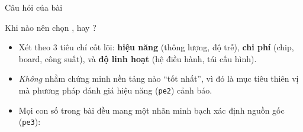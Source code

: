 
\begin{frame}{Câu hỏi của bài}
\begin{center}
{\Large Khi nào nên chọn \MCU, \FPGA{} hay \SoC?}
\end{center}
\bigskip
\begin{itemize}\setlength{\itemsep}{6pt}
\item Xét theo 3 tiêu chí cốt lõi: \textbf{hiệu năng} (thông lượng, độ trễ), \textbf{chi phí} (chip, board, công suất), và \textbf{độ linh hoạt} (hệ điều hành, tái cấu hình).
\item \emph{Không} nhằm chứng minh nền tảng nào ``tốt nhất'', vì đó là mục tiêu thiên vị mà phương pháp đánh giá hiệu năng (\texttt{pe2}) cảnh báo.
\item Mọi con số trong bài đều mang một nhãn minh bạch xác định nguồn gốc (\texttt{pe3}):\\
          
\end{itemize}
\end{frame}

